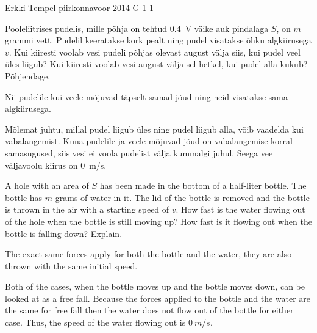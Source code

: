 {Erkki Tempel} %
{piirkonnavoor} %
{2014} %
{G 1} %
{1} %
{
\ifStatement
Pooleliitrises pudelis, mille põhja on tehtud \SI{0.4}{V} väike auk pindalaga $S$, on $m$ grammi vett. Pudelil keeratakse kork pealt ning pudel visatakse õhku algkiirusega $v$. Kui kiiresti voolab vesi pudeli põhjas olevast august välja siis, kui pudel veel üles liigub? Kui kiiresti voolab vesi august välja sel hetkel, kui pudel alla kukub? Põhjendage.
\fi


\ifHint
Nii pudelile kui veele mõjuvad täpselt samad jõud ning neid visatakse sama algkiirusega.
\fi


\ifSolution
Mõlemat juhtu, millal pudel liigub üles ning pudel liigub alla, võib vaadelda kui vabalangemist. Kuna pudelile ja veele mõjuvad jõud on vabalangemise korral samasugused, siis vesi ei voola pudelist välja kummalgi juhul. Seega vee väljavoolu kiirus on \SI{0}{m/s}.
\fi


\ifEngStatement
A hole with an area of $S$ has been made in the bottom of a half-liter bottle. The bottle has $m$ grams of water in it. The lid of the bottle is removed and the bottle is thrown in the air with a starting speed of $v$. How fast is the water flowing out of the hole when the bottle is still moving up? How fast is it flowing out when the bottle is falling down? Explain.
\fi


\ifEngHint
The exact same forces apply for both the bottle and the water, they are also thrown with the same initial speed.
\fi


\ifEngSolution
Both of the cases, when the bottle moves up and the bottle moves down, can be looked at as a free fall. Because the forces applied to the bottle and the water are the same for free fall then the water does not flow out of the bottle for either case. Thus, the speed of the water flowing out is $\SI{0}{m/s}$.
\fi
}